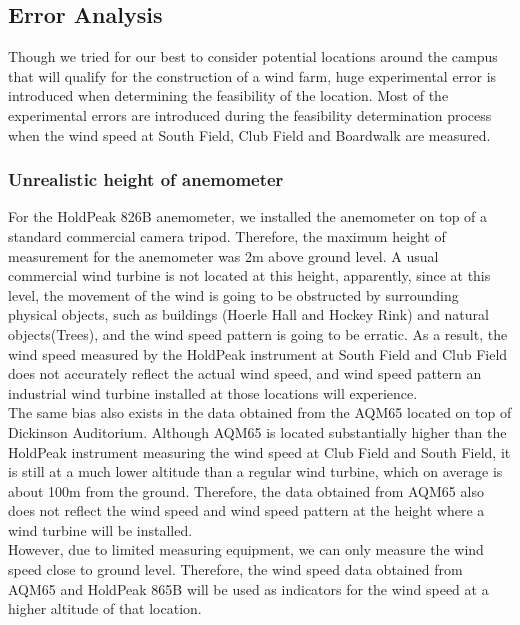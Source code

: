 \documentclass[review]{elsarticle}
\begin{document}
\subsection{Error Analysis}
\label{sec:analysis:erroranalysis}

Though we tried for our best to consider potential locations around the campus that will qualify for the construction of a wind farm, huge experimental 
error is introduced when determining the feasibility of the location. Most of the experimental errors are introduced during the feasibility determination 
process when the wind speed at South Field, Club Field and Boardwalk are measured.

\subsubsection{Unrealistic height of anemometer}
\label{sec:analysis:erroranalysis:unrealisticheight}
For the HoldPeak 826B anemometer, we installed the anemometer on top of a standard commercial camera tripod. Therefore, the maximum height of measurement 
for the anemometer was 2m above ground level. A usual commercial wind turbine is not located at this height, apparently, since at this level, the movement 
of the wind is going to be obstructed by surrounding physical objects, such as buildings (Hoerle Hall and Hockey Rink) and natural objects(Trees), and the 
wind speed pattern is going to be erratic. As a result, the wind speed measured by the HoldPeak instrument at South Field and Club Field does not accurately 
reflect the actual wind speed, and wind speed pattern an industrial wind turbine installed at those locations will experience. 
\\\indent The same bias also exists in the data obtained from the AQM65 located on top of Dickinson Auditorium. Although AQM65 is located substantially 
higher than the HoldPeak instrument measuring the wind speed at Club Field and South Field, it is still at a much lower altitude than a regular wind turbine, 
which on average is about 100m from the ground. Therefore, the data obtained from AQM65 also does not reflect the wind speed and wind speed pattern at the 
height where a wind turbine will be installed. 
\\\indent However, due to limited measuring equipment, we can only measure the wind speed close to ground level. Therefore, the wind speed data obtained 
from AQM65 and HoldPeak 865B will be used as indicators for the wind speed at a higher altitude of that location.
\end{document}
